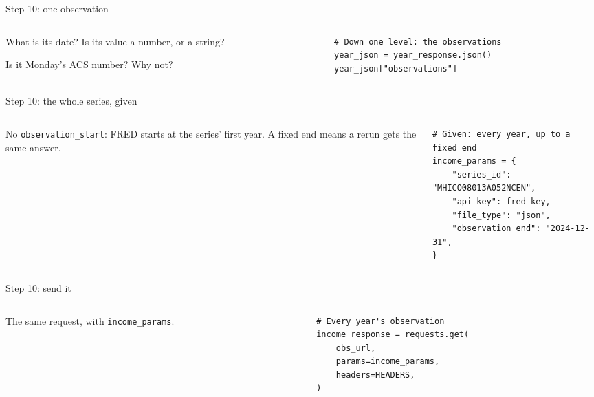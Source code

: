 \documentclass[9pt,aspectratio=169]{beamer}
\begin{document}
\begin{frame}[fragile]{Step 10: one observation}
    \begin{columns}[T]
        \begin{column}{0.37\textwidth}
            What is its date? Is its value a number, or a string?

            \medskip
            Is it Monday's ACS number? Why not?
        \end{column}
        \begin{column}{0.6\textwidth}
\begin{lstlisting}
# Down one level: the observations
year_json = year_response.json()
year_json["observations"]
\end{lstlisting}
        \end{column}
    \end{columns}
\end{frame}

\begin{frame}[fragile]{Step 10: the whole series, given}
    \begin{columns}[T]
        \begin{column}{0.37\textwidth}
            No \texttt{observation\_start}: FRED starts at the series' first year. A fixed end means a rerun gets the same answer.
        \end{column}
        \begin{column}{0.6\textwidth}
\begin{lstlisting}
# Given: every year, up to a fixed end
income_params = {
    "series_id": "MHICO08013A052NCEN",
    "api_key": fred_key,
    "file_type": "json",
    "observation_end": "2024-12-31",
}
\end{lstlisting}
        \end{column}
    \end{columns}
\end{frame}

\begin{frame}[fragile]{Step 10: send it}
    \begin{columns}[T]
        \begin{column}{0.37\textwidth}
            The same request, with \texttt{income\_params}.
        \end{column}
        \begin{column}{0.6\textwidth}
\begin{lstlisting}
# Every year's observation
income_response = requests.get(
    obs_url,
    params=income_params,
    headers=HEADERS,
)
\end{lstlisting}
        \end{column}
    \end{columns}
\end{frame}
\end{document}
